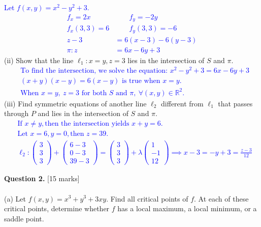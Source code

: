 \documentclass[12pt]{article}
\newcommand{\R}{\mathbb{R}}
\begin{document}
\textcolor{blue}{
Let $f(x,y)=x^2-y^2+3$.
\begin{align*}
	f_x=2x &\qquad f_y=-2y\\
	f_x(3,3)=6 &\qquad f_y(3,3)=-6\\
	z-3&=6(x-3)-6(y-3)\\
	\pi:z&=6x-6y+3
\end{align*}
}
\indent\indent
(ii) Show that the line $\ell_1:x=y,z=3$ lies in the intersection of $S$ and $\pi$.
\textcolor{blue}{
\begin{align*}
	&\text{To find the intersection, we solve the equation: } x^2-y^2+3=6x-6y+3\\
	&(x+y)(x-y)=6(x-y)\text{ is true when }x=y.\\
	&\text{When }x=y, \ z=3\text{ for both }S\text{ and }\pi, \ \forall (x,y)\in \R^2.
\end{align*}
}\newpage
\indent\indent
(iii) Find symmetric equations of another line $\ell_2$ different from $\ell_1$ that passes through $P$ and lies in the intersection of $S$ and $\pi$.
\textcolor{blue}{
\begin{align*}
	&\text{If }x\neq y, \text{then the intersection yields }x+y=6.\\
	&\text{Let }x=6,y=0,\text{then }z=39.\\
	&\ell_2:\begin{pmatrix}
		3\\3\\3
	\end{pmatrix} +\begin{pmatrix}
		6-3\\0-3\\39-3
	\end{pmatrix}=\begin{pmatrix}
		3\\3\\3
	\end{pmatrix}+\lambda\begin{pmatrix}
		1\\-1\\12
	\end{pmatrix}\implies x-3=-y+3=\frac{z-3}{12}
\end{align*}
}


{\bf Question 2.} [15 marks]\\
\\\indent
(a) Let $f(x,y)=x^3+y^3+3xy$. Find all critical points of $f$. At each of these critical points, determine whether $f$ has a local maximum, a local minimum, or a saddle point.\\
\end{document}
